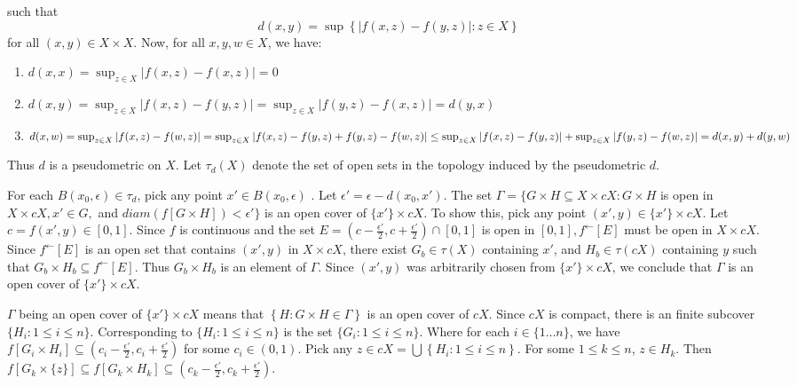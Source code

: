 \documentclass{article}
\begin{document}
    such that $$d(x,y)=\sup \left\{ \left|f(x,z)-f(y,z)\right|: z\in X\right\}$$ for all $(x,y) \in X \times X$. 
    Now, for all $x,y,w \in X$, we have: 

    \begin{enumerate}
    \item $d(x,x)=\sup_{z\in X} |f(x,z)-f(x,z)|=0$
    \item $d(x,y)=\sup_{z\in X} |f(x,z)-f(y,z)|=\sup_{z\in X} |f(y,z)-f(x,z)|=d(y,x)$
    \item $d(x,w)=\sup_{z\in X} |f(x,z)-f(w,z)|\\
		  =\sup_{z\in X} |f(x,z)-f(y,z)+f(y,z)-f(w,z)|\\
		  \leq \sup_{z\in X} |f(x,z)-f(y,z)|+\sup_{z\in X} |f(y,z)-f(w,z)|\\
		  =d(x,y)+d(y,w)$
		  \end{enumerate}


		  Thus $d$ is a pseudometric on $X$. Let $\tau_d(X)$ denote the set of open sets in the topology induced by the pseudometric $d$. 

		  \vskip 10pt

		  For each $B(x_0, \epsilon) \in \tau_d$, pick any point $x' \in B(x_0, \epsilon)$ . Let $\epsilon' = \epsilon - d(x_0,x').$ 
		  The set $\Gamma=\{ G \times H \subseteq X \times cX : G \times H$ is open in $X \times cX, x'\in G,$ and $diam\left(f\left[G\times H\right]\right)<\epsilon' \}$ is an open cover of $\{x'\} \times cX$. To show this, pick any point $(x',y)\in \{x'\} \times cX$. Let $c=f(x',y)\in [0,1].$ Since $f$ is continuous and the set $E=(c-\frac{\epsilon'}{2}, c+\frac{\epsilon'}{2}) \cap [0,1]$ is open in $[0,1], f^\leftarrow[E]$ must be open in $X\times cX$. Since $f^{\leftarrow}[E]$ is an open set that contains $(x',y)$ in $X\times cX$, there exist $G_b \in \tau(X)$ containing $x'$, and $H_b \in \tau(cX)$ containing $y$ such that $G_b\times H_b\subseteq f^\leftarrow[E]$. Thus $G_b\times H_b$ is an element of $\Gamma$. Since $(x',y)$ was arbitrarily chosen from $\{x'\}\times cX$, we conclude that $\Gamma$ is an open cover of $\{x'\}\times cX$.

		  \vskip 10pt

		  $\Gamma$ being an open cover of $\{x'\}\times cX$ means that $\left\{H : G\times H \in \Gamma\right\}$ is an open cover of $cX$. Since $cX$ is compact, there is an finite subcover $\{ H_i: 1\leq i \leq n\}.$ Corresponding to $\{ H_i: 1\leq i \leq n\}$ is the set $\{ G_i: 1\leq i \leq n\}$. Where for each $i \in \{1\dots n\}$, we have $f[G_i \times H_i] \subseteq (c_i-\frac{\epsilon'}{2}, c_i+\frac{\epsilon'}{2})$ for some $c_i \in (0,1).$ Pick any $z \in cX=\bigcup \left\{H_i: 1\leq i\leq n\right\}.$ For some $1 \leq k \leq n$, $z \in H_k$. Then $f[G_k\times \{z\}] \subseteq f[G_k\times H_k]\subseteq (c_k-\frac{\epsilon'}{2}, c_k+\frac{\epsilon'}{2}).$ 
\end{document}
